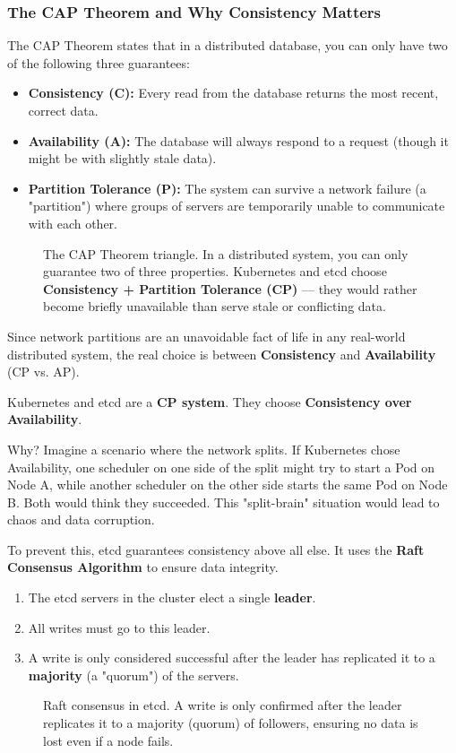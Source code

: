 \subsubsection{\textbf{The CAP Theorem and Why Consistency Matters}}


The CAP Theorem states that in a distributed database, you can only have two of the following three guarantees:
\begin{itemize}
\item \textbf{Consistency (C):} Every read from the database returns the most recent, correct data.
\item \textbf{Availability (A):} The database will always respond to a request (though it might be with slightly stale data).
\item \textbf{Partition Tolerance (P):} The system can survive a network failure (a "partition") where groups of servers are temporarily unable to communicate with each other.
\end{itemize}
\begin{figure}[htbp]
\centering

\caption{The CAP Theorem triangle. In a distributed system, you can only guarantee two of three properties. Kubernetes and etcd choose \textbf{Consistency + Partition Tolerance (CP)} --- they would rather become briefly unavailable than serve stale or conflicting data.}
\label{fig:5_4}
\end{figure}



Since network partitions are an unavoidable fact of life in any real-world distributed system, the real choice is between \textbf{Consistency} and \textbf{Availability} (CP vs. AP).

Kubernetes and etcd are a \textbf{CP system}. They choose \textbf{Consistency over Availability}.

Why? Imagine a scenario where the network splits. If Kubernetes chose Availability, one scheduler on one side of the split might try to start a Pod on Node A, while another scheduler on the other side starts the same Pod on Node B. Both would think they succeeded. This "split-brain" situation would lead to chaos and data corruption.

To prevent this, etcd guarantees consistency above all else. It uses the \textbf{Raft Consensus Algorithm} to ensure data integrity.
\begin{enumerate}
\item The etcd servers in the cluster elect a single \textbf{leader}.
\item All writes must go to this leader.
\item A write is only considered successful after the leader has replicated it to a \textbf{majority} (a "quorum") of the servers.
\end{enumerate}
\begin{figure}[htbp]
\centering

\caption{Raft consensus in etcd. A write is only confirmed after the leader replicates it to a majority (quorum) of followers, ensuring no data is lost even if a node fails.}
\label{fig:5_5}
\end{figure}



